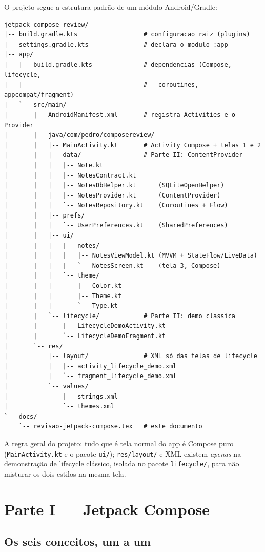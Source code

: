 \documentclass[11pt,a4paper]{article}
\begin{document}
O projeto segue a estrutura padrão de um módulo Android/Gradle:

\begin{verbatim}
jetpack-compose-review/
|-- build.gradle.kts                  # configuracao raiz (plugins)
|-- settings.gradle.kts               # declara o modulo :app
|-- app/
|   |-- build.gradle.kts              # dependencias (Compose, lifecycle,
|   |                                 #   coroutines, appcompat/fragment)
|   `-- src/main/
|       |-- AndroidManifest.xml       # registra Activities e o Provider
|       |-- java/com/pedro/composereview/
|       |   |-- MainActivity.kt       # Activity Compose + telas 1 e 2
|       |   |-- data/                 # Parte II: ContentProvider
|       |   |   |-- Note.kt
|       |   |   |-- NotesContract.kt
|       |   |   |-- NotesDbHelper.kt      (SQLiteOpenHelper)
|       |   |   |-- NotesProvider.kt      (ContentProvider)
|       |   |   `-- NotesRepository.kt    (Coroutines + Flow)
|       |   |-- prefs/
|       |   |   `-- UserPreferences.kt    (SharedPreferences)
|       |   |-- ui/
|       |   |   |-- notes/
|       |   |   |   |-- NotesViewModel.kt (MVVM + StateFlow/LiveData)
|       |   |   |   `-- NotesScreen.kt    (tela 3, Compose)
|       |   |   `-- theme/
|       |   |       |-- Color.kt
|       |   |       |-- Theme.kt
|       |   |       `-- Type.kt
|       |   `-- lifecycle/            # Parte II: demo classica
|       |       |-- LifecycleDemoActivity.kt
|       |       `-- LifecycleDemoFragment.kt
|       `-- res/
|           |-- layout/               # XML só das telas de lifecycle
|           |   |-- activity_lifecycle_demo.xml
|           |   `-- fragment_lifecycle_demo.xml
|           `-- values/
|               |-- strings.xml
|               `-- themes.xml
`-- docs/
    `-- revisao-jetpack-compose.tex   # este documento
\end{verbatim}

A regra geral do projeto: tudo que é tela normal do app é Compose puro
(\texttt{MainActivity.kt} e o pacote \texttt{ui/}); \texttt{res/layout/} e
XML existem \emph{apenas} na demonstração de lifecycle clássico, isolada
no pacote \texttt{lifecycle/}, para não misturar os dois estilos na
mesma tela.

\section{Parte I --- Jetpack Compose}
\label{sec:compose}

\subsection{Os seis conceitos, um a um}
\end{document}
